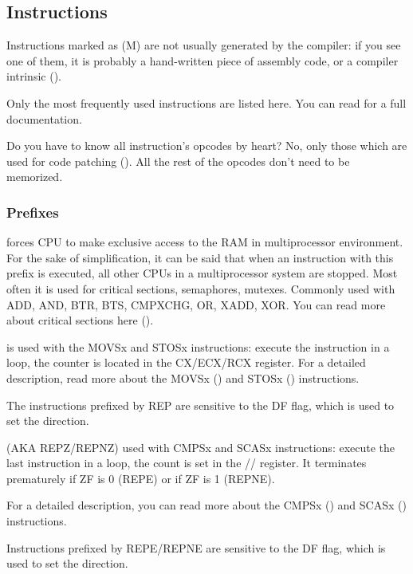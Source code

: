 \subsection{Instructions}
\label{sec:x86_instructions}

Instructions marked as (M) are not usually generated by the compiler: if you see one of them, it is probably
a hand-written piece of assembly code, or a compiler intrinsic ().


Only the most frequently used instructions are listed here.
You can read  for a full documentation.

Do you have to know all instruction's opcodes by heart?
No, only those which are used for code patching ().
All the rest of the opcodes don't need to be memorized.

\subsubsection{Prefixes}

\begin{description}
\label{x86_lock}
\item[LOCK] forces CPU to make exclusive access to the RAM in multiprocessor environment.
For the sake of simplification, it can be said that when an instruction
with this prefix is executed, all other CPUs in a multiprocessor system are stopped.
Most often
it is used for critical sections, semaphores, mutexes.
Commonly used with ADD, AND, BTR, BTS, CMPXCHG, OR, XADD, XOR.
You can read more about critical sections here ().

\item[REP] is used with the MOVSx and STOSx instructions:
execute the instruction in a loop, the counter is located in the CX/ECX/RCX register.
For a detailed description, read more about the MOVSx () 
and STOSx () instructions.

The instructions prefixed by REP are sensitive to the DF flag, which is used to set the direction.

\item[REPE/REPNE] (\ac{AKA} REPZ/REPNZ) used with CMPSx and
SCASx instructions:
execute the last instruction in a loop, the count is set in the // register.
It terminates prematurely if ZF is 0 (REPE) or if ZF is 1 (REPNE).

For a detailed description, you can read more about the CMPSx () 
and SCASx () instructions.

Instructions prefixed by REPE/REPNE are sensitive to the DF flag, which is used to set the direction.

\end{description}

